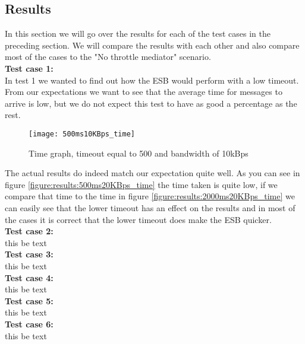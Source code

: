 \subsection{Results}\label{Testing:Results}
	In this section we will go over the results for each of the test cases in the preceding section. We will compare the results with each other and also compare most of the cases to the "No throttle mediator" scenario.\\
	 
    \textbf{Test case 1:}\\
    In test 1 we wanted to find out how the ESB would perform with a low timeout. From our expectations we want to see that the average time for messages to arrive is low, but we do not expect this test to have as good a percentage as the rest. 
    
	\begin{figure}[H]
		\centering
		\texttt{[image: 500ms10KBps\_time]}
		\caption{Time graph, timeout equal to 500 and bandwidth of 10kBps} 
		\label{figure:results:500ms10KBps_time}
	\end{figure}
    
    The actual results do indeed match our expectation quite well. As you can see in figure \ref{figure:results:500ms20KBps_time} the time taken is quite low, if we compare that time to the time in figure \ref{figure:results:2000ms20KBps_time} we can easily see that the lower timeout has an effect on the results and in most of the cases it is correct that the lower timeout does make the ESB quicker.\\
    
    \textbf{Test case 2:}\\
    this be text\\
    
    \textbf{Test case 3:}\\
    this be text\\
    
    \textbf{Test case 4:}\\
    this be text\\
    
    \textbf{Test case 5:}\\
    this be text\\
    
    \textbf{Test case 6:}\\
    this be text\\
